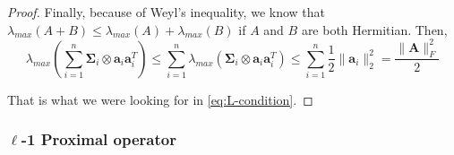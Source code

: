 \documentclass[12pt]{article}
\newcommand{\aat}{\mathbf{a}_{i} \mathbf{a}_{i}^{T}}
\newcommand{\bigsigma}{\mathbf{\Sigma}_{i}}
\begin{document}
\begin{proof}
Finally, because of Weyl's inequality, we know that $\lambda_{max}(A + B) \leq \lambda_{max}(A) + \lambda_{max}(B)$ if $A$ and $B$ are both Hermitian. Then,
\begin{equation}
    \lambda_{max} \left (\sum_{i=1}^{n} \bigsigma \otimes \aat \right) \leq \sum_{i=1}^{n} \lambda_{max} (\bigsigma \otimes \aat) \leq \sum_{i=1}^{n} \frac{1}{2} \lVert \mathbf{a}_i \rVert_{2}^{2} = \frac{\lVert \mathbf{A} \rVert_{F}^{2}}{2}
\end{equation}

That is what we were looking for in \eqref{eq:L-condition}.
\end{proof}

\subsubsection{\texorpdfstring{$\ell$}{Lg}-1 Proximal operator}
\end{document}
